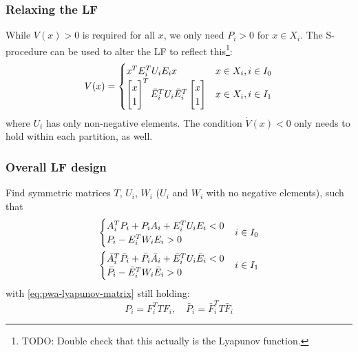 \subsubsection{Relaxing the LF}
While $V(x) > 0$ is required for all $x$, we only need $P_i > 0$ for $x \in X_i$. The S-procedure can be used to alter the LF to reflect this\footnote{TODO: Double check that this actually is the Lyapunov function.}:
%
\begin{equation}
  V(x) =
  \begin{cases}
    x^{T} E_i^{T} U_i E_i x & x \in X_i, i \in I_0 \\
    \begin{bmatrix} x \\ 1 \end{bmatrix}^{T}
    \bar{E}_i^{T} U_i \bar{E}_i^{T}
    \begin{bmatrix} x \\ 1 \end{bmatrix} & x \in X_i, i \in I_1
  \end{cases}
\end{equation}
%
where $U_i$ has only non-negative elements. The condition $\dot{V}(x)<0$ only needs to hold within each partition, as well.

\subsubsection{Overall LF design}
Find symmetric matrices $T$, $U_i$, $W_i$ ($U_i$ and $W_i$ with no negative elements), such that
%
\begin{equation}
  \begin{split}
    \begin{cases}
      A_i^{T} P_i + P_i A_i + E_i^{T} U_i E_i < 0 \\
      P_i - E_i^{T} W_i E_i > 0
    \end{cases} &i \in I_0 \\
    \begin{cases}
      \bar{A}_i^{T} \bar{P}_i + \bar{P}_i \bar{A}_i + \bar{E}_i^{T} U_i \bar{E}_i < 0 \\
      \bar{P}_i - \bar{E}_i^{T} W_i \bar{E}_i > 0
    \end{cases} &i \in I_1
  \end{split}
\end{equation}
with \eqref{eq:pwa-lyapunov-matrix} still holding:
\begin{equation}
  P_i = F_i^T T F_i,\quad \bar{P}_i = \bar{F}_i^T T \bar{F}_i
\end{equation}

